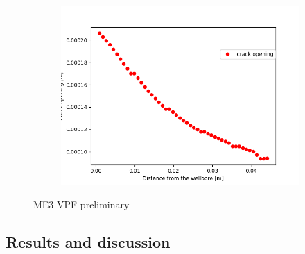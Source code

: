 \begin{figure}[!ht]
\begin{subfigure}[c]{0.49\textwidth}
\label{fig:ME3_VPF_model}
\end{subfigure}
\hfill
\begin{subfigure}[c]{0.49\textwidth}
\includegraphics[width=1\textwidth]{figures/ME3_CrackWidth.png}
\label{fig:ME3_VPF_crack widht}
\end{subfigure}
\caption{ME3 VPF preliminary}
\end{figure}


\subsection{Results and discussion}
